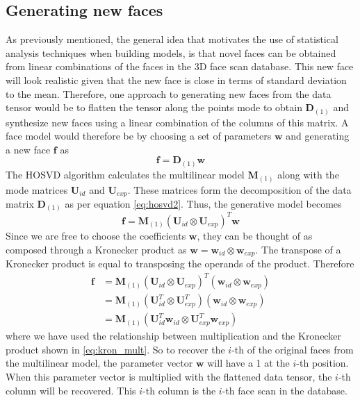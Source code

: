 \documentclass[11pt,a4paper]{report}
\begin{document}
\subsection{Generating new faces}
As previously mentioned, the general idea that motivates the use of statistical
analysis techniques when building models, is that
novel faces can be obtained from linear combinations of the faces in the 3D
face scan database. This new face will look realistic given that the new face is close in terms of standard
deviation to the mean. Therefore, one approach to generating new faces from the
data tensor would be to flatten the tensor along the points mode to obtain
$\mathbf{D}_{(1)}$ and synthesize new faces using a linear combination of the
columns of this matrix. A face model would therefore be by choosing a set of
parameters $\mathbf{w}$ and generating a new face $\mathbf{f}$ as 
\begin{equation}\label{eq:gen}
\mathbf{f} = \mathbf{D}_{(1)}\mathbf{w}
\end{equation}
The HOSVD algorithm calculates the multilinear model $\mathbf{M}_{(1)}$ along with the mode
matrices $\mathbf{U}_{id}$ and $\mathbf{U}_{exp}$. These matrices form the
decomposition of the data matrix $\mathbf{D}_{(1)}$ as per equation
\ref{eq:hosvd2}. Thus, the generative model becomes
\begin{equation}
\mathbf{f} = \mathbf{M}_{(1)}(\mathbf{U}_{id} \otimes \mathbf{U}_{exp})^T\mathbf{w}
\end{equation}
Since we are free to choose the coefficients $\mathbf{w}$, they can be
thought of as composed through a Kronecker product as $\mathbf{w} =
\mathbf{w}_{id} \otimes \mathbf{w}_{exp}$. The transpose of a Kronecker product
is equal to transposing the operands of the product. Therefore
\begin{align}\label{eq:gen1}
\mathbf{f} &= \mathbf{M}_{(1)}(\mathbf{U}_{id} \otimes
\mathbf{U}_{exp})^T(\mathbf{w}_{id} \otimes \mathbf{w}_{exp})\\
&=\mathbf{M}_{(1)}(\mathbf{U}_{id}^T \otimes
\mathbf{U}_{exp}^T)(\mathbf{w}_{id} \otimes \mathbf{w}_{exp})\\
\label{eq:gen2}
&= \mathbf{M}_{(1)}(\mathbf{U}_{id}^T\mathbf{w}_{id} \otimes
\mathbf{U}_{exp}^T\mathbf{w}_{exp})
\end{align}
where we have used the relationship between multiplication and the Kronecker
product shown in \ref{eq:kron_mult}. So to recover the $i$-th of the original faces
from the multilinear model, the parameter vector $\mathbf{w}$ will have a 1 at
the $i$-th position. When this parameter vector is multiplied with the flattened
data tensor, the $i$-th column will be recovered. This $i$-th column is the
$i$-th face scan in the database. 
\end{document}
